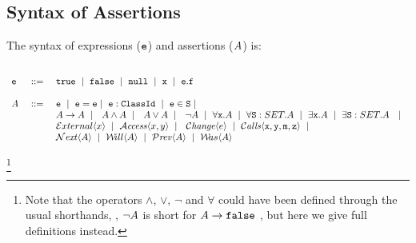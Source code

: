 

\subsection{Syntax of Assertions}

\begin{definition}[Assertions] The syntax of   expressions (${\mbox{\tt{e}}}$) and assertions ($A$) is:
\label{def:assertions}

 $\begin{array}{lcl}
  ~  \\
  \SE & ::= &  \prg{true}  \ \mid\ \prg{false}  \    \mid\ \prg{null}  \ \mid \ \x  \ \mid \ \SE.\f  \\  
 ~ \\
\A &\ ::=\  &   \SE \   \mid \  \SE=\SE  \mid \   \SE:\prg{ClassId}  \ \mid \
    \SE\in\prg{S}   \mid  \  \\
    & &  \A \rightarrow \A  \ \mid\  \     \A \wedge \A  \ \mid\  \ \A \vee \A  \ \mid\  \ \neg A   \ \mid \  \forall \x.\A  \ \mid \  \forall \prg{S}:SET.\A  \ \mid  \  \exists \x.\A  \ \mid \  \exists \prg{S}:SET.\A  \  \ \mid\   \\
 &    & \External x   \ \mid\   \CanAccess x y \ \mid\  \ \Changes e \ \mid\  \Calls{\prg{x},\prg{y},\prg{m},\prg{z}} \ \mid\  \\  
 &    &  \Next \A  \ \mid \   \Future \A \ \mid \  \Prev \A    \ \mid \  \Past \A \ 
\end{array}$
\end{definition}
\footnote{
Note that the operators $\wedge$, $\vee$,  $\neg$ and $\forall$  could have been defined  through the usual shorthands, \eg, $\neg A$ is short for
$A \rightarrow {\mbox{\tt{false}}}$ \etc, but here we give full definitions instead.}


